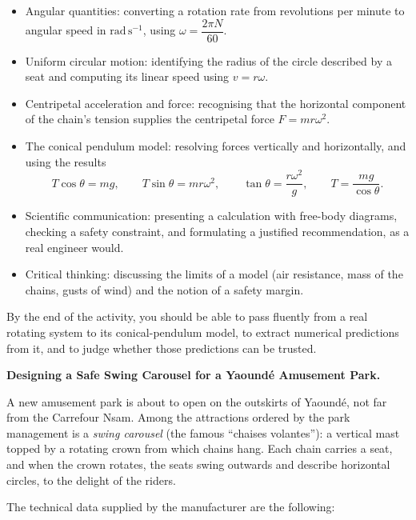 \documentclass[11pt]{article}
\newcommand{\cle}[1]{{\popxbold\color{popdark}#1}}
\newcounter{popsec}
\newcounter{popsub}
\newcommand{\courssub}[1]{%
  \stepcounter{popsub}%
  \par\vspace{9pt}\noindent{\popxbold\fontsize{11.5}{13}\selectfont\color{popink}{\color{poporange}\thepopsec.\thepopsub}\hspace{6pt}#1}\par\nopagebreak\vspace{4pt}
}
\begin{document}
\begin{itemize}
\item \cle{Angular quantities}: converting a rotation rate from revolutions per minute to angular speed in $\mathrm{rad\,s^{-1}}$, using $\omega = \dfrac{2\pi N}{60}$.
\item \cle{Uniform circular motion}: identifying the radius of the circle described by a seat and computing its \cle{linear speed} using $v = r\omega$.
\item \cle{Centripetal acceleration and force}: recognising that the horizontal component of the chain's tension supplies the centripetal force $F = m r \omega^2$.
\item \cle{The conical pendulum model}: resolving forces vertically and horizontally, and using the results
\[ T\cos\theta = mg, \qquad T\sin\theta = m r \omega^2, \qquad \tan\theta = \frac{r\omega^2}{g}, \qquad T = \frac{mg}{\cos\theta}. \]
\item \cle{Scientific communication}: presenting a calculation with free-body diagrams, checking a safety constraint, and formulating a justified recommendation, as a real engineer would.
\item \cle{Critical thinking}: discussing the limits of a model (air resistance, mass of the chains, gusts of wind) and the notion of a safety margin.
\end{itemize}

By the end of the activity, you should be able to pass fluently from a real rotating system to its conical-pendulum model, to extract numerical predictions from it, and to judge whether those predictions can be trusted.

\courssub{Situation}

\textbf{Designing a Safe Swing Carousel for a Yaoundé Amusement Park.}\par\medskip

A new amusement park is about to open on the outskirts of Yaoundé, not far from the Carrefour Nsam. Among the attractions ordered by the park management is a \emph{swing carousel} (the famous ``chaises volantes''): a vertical mast topped by a rotating crown from which chains hang. Each chain carries a seat, and when the crown rotates, the seats swing outwards and describe horizontal circles, to the delight of the riders.

The technical data supplied by the manufacturer are the following:
\end{document}
